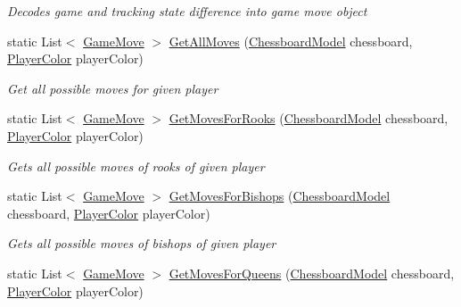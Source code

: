 \begin{DoxyCompactItemize}
\begin{DoxyCompactList}\small\item\em Decodes game and tracking state difference into game move object \end{DoxyCompactList}\item 
static List$<$ \mbox{\hyperlink{class_chess_tracking_1_1_game_1_1_game_move}{Game\+Move}} $>$ \mbox{\hyperlink{class_chess_tracking_1_1_game_1_1_game_validator_ac398b44f0918461ab68a70f117c8d45b}{Get\+All\+Moves}} (\mbox{\hyperlink{class_chess_tracking_1_1_game_1_1_chessboard_model}{Chessboard\+Model}} chessboard, \mbox{\hyperlink{namespace_chess_tracking_1_1_game_ab79070a55977a8c8326e9cdda7dcfa9a}{Player\+Color}} player\+Color)
\begin{DoxyCompactList}\small\item\em Get all possible moves for given player \end{DoxyCompactList}\item 
static List$<$ \mbox{\hyperlink{class_chess_tracking_1_1_game_1_1_game_move}{Game\+Move}} $>$ \mbox{\hyperlink{class_chess_tracking_1_1_game_1_1_game_validator_a98518e2fd8e0ce4768cb254a402c6c82}{Get\+Moves\+For\+Rooks}} (\mbox{\hyperlink{class_chess_tracking_1_1_game_1_1_chessboard_model}{Chessboard\+Model}} chessboard, \mbox{\hyperlink{namespace_chess_tracking_1_1_game_ab79070a55977a8c8326e9cdda7dcfa9a}{Player\+Color}} player\+Color)
\begin{DoxyCompactList}\small\item\em Gets all possible moves of rooks of given player \end{DoxyCompactList}\item 
static List$<$ \mbox{\hyperlink{class_chess_tracking_1_1_game_1_1_game_move}{Game\+Move}} $>$ \mbox{\hyperlink{class_chess_tracking_1_1_game_1_1_game_validator_a72c7c0dabb399e9a15ff60faa7b7cba6}{Get\+Moves\+For\+Bishops}} (\mbox{\hyperlink{class_chess_tracking_1_1_game_1_1_chessboard_model}{Chessboard\+Model}} chessboard, \mbox{\hyperlink{namespace_chess_tracking_1_1_game_ab79070a55977a8c8326e9cdda7dcfa9a}{Player\+Color}} player\+Color)
\begin{DoxyCompactList}\small\item\em Gets all possible moves of bishops of given player \end{DoxyCompactList}\item 
static List$<$ \mbox{\hyperlink{class_chess_tracking_1_1_game_1_1_game_move}{Game\+Move}} $>$ \mbox{\hyperlink{class_chess_tracking_1_1_game_1_1_game_validator_afd2936714cc765530dc2208304d29c1d}{Get\+Moves\+For\+Queens}} (\mbox{\hyperlink{class_chess_tracking_1_1_game_1_1_chessboard_model}{Chessboard\+Model}} chessboard, \mbox{\hyperlink{namespace_chess_tracking_1_1_game_ab79070a55977a8c8326e9cdda7dcfa9a}{Player\+Color}} player\+Color)

\end{DoxyCompactItemize}
